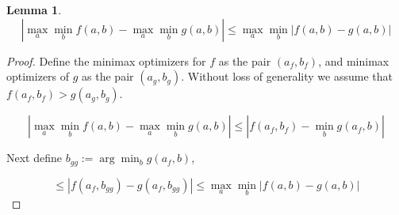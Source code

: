 \documentclass{journal}
\newtheorem{lemma}{Lemma}
\begin{document}
\begin{lemma}\label{lem:maxmin}
\begin{equation} 
|\max_a \min_b f(a,b) -\max_a \min_b g(a,b)| \leq \max_a \min_b |f(a,b) - g(a,b)|
\end{equation}
\end{lemma}

\begin{proof}
Define the minimax optimizers for $f$ as the pair $(a_f,b_f)$, and minimax optimizers of $g$ as the pair $(a_g, b_g)$. Without loss of generality we assume that $f(a_f,b_f) > g(a_g,b_g)$.

\begin{equation*}
|\max_a \min_b f(a,b) -\max_a \min_b g(a,b)| \leq |f(a_f,b_f) - \min_b g(a_f,b)|
\end{equation*}

\noindent Next define $b_{gg} :=\arg\min_b g(a_f,b)$,

\begin{equation*}
\leq |f(a_f,b_{gg}) - g(a_f,b_{gg})| \leq \max_a \min_b |f(a,b) - g(a,b)|
\end{equation*}
\end{proof}
\end{document}
